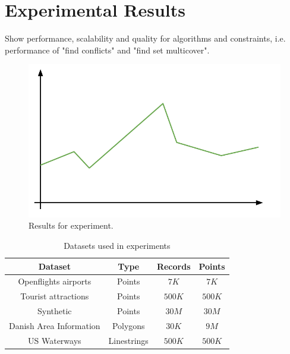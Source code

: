 \section{Experimental Results}
Show performance, scalability and quality for algorithms and constraints, i.e. performance of "find conflicts" and "find set multicover".

\begin{figure}[htbp]
\begin{center}
\includegraphics[scale=.5]{figs/cvl_todo.pdf}
\caption{Results for experiment.}
\label{fig:results-x}
\end{center}
\end{figure}

\begin{table}[htdp]
\caption{Datasets used in experiments}
\begin{center}
\begin{tabular}{|c|c|c|c|}
\hline
\textbf{Dataset} & \textbf{Type} & \textbf{Records} & \textbf{Points} \\
\hline
Openflights airports & Points & $7K$ & $7K$ \\
Tourist attractions & Points & $500K$ & $500K$ \\
Synthetic & Points & $30M$ & $30M$ \\
Danish Area Information & Polygons & $30K$ & $9M$ \\
US Waterways & Linestrings & $500K$ & $500K$ \\
\hline
\end{tabular}
\end{center}
\label{default}
\end{table}%
